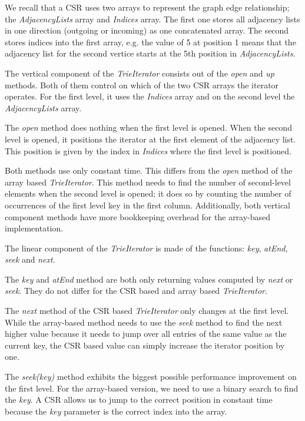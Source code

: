 We recall that a CSR uses two arrays to represent the graph edge relationship;
the \textit{AdjacencyLists} array and \textit{Indices} array.
The first one stores all adjacency lists in one direction (outgoing or incoming) as one concatenated array.
The second stores indices into the first array, e.g. the value of 5 at position 1 means that the adjacency list
for the second vertice starts at the 5th position in \textit{AdjacencyLists}.

The vertical component of the \textit{TrieIterator} consists out of the \textit{open} and \textit{up} methods.
Both of them control on which of the two \textsc{CSR} arrays the iterator operates.
For the first level, it uses the \textit{Indices} array and on the second level the \textit{AdjacencyLists} array.

The \textit{open} method does nothing when the first level is opened.
When the second level is opened, it positions the iterator at the first element of the adjacency list.
This position is given by the index in \textit{Indices} where the first level is positioned.

Both methods use only constant time.
This differs from the \textit{open} method of the array based \textit{TrieIterator}.
This method needs to find the number of second-level elements when the second level is opened;
it does so by counting the number of occurrences of the first level key in the first column.
Additionally, both vertical component methods have more bookkeeping overhead for the array-based implementation.

The linear component of the \textit{TrieIterator} is made of the functions: \textit{key}, \textit{atEnd}, \textit{seek} and
\textit{next}.

The \textit{key} and \textit{atEnd} method are both only returning values computed by \textit{next} or \textit{seek}.
They do not differ for the \textsc{CSR} based and array based \textit{TrieIterator}.

The \textit{next} method of the CSR based \textit{TrieIterator} only changes at the first level.
While the array-based method needs to use the \textit{seek} method to find the next higher value because
it needs to jump over all entries of the same value as the current key, the CSR based value can simply increase
the iterator position by one.

The \textit{seek(key)} method exhibits the biggest possible performance improvement on the first level.
For the array-based version, we need to use a binary search to find the \textit{key}.
A CSR allows us to jump to the correct position in constant time because the \textit{key} parameter is the correct
index into the array.

